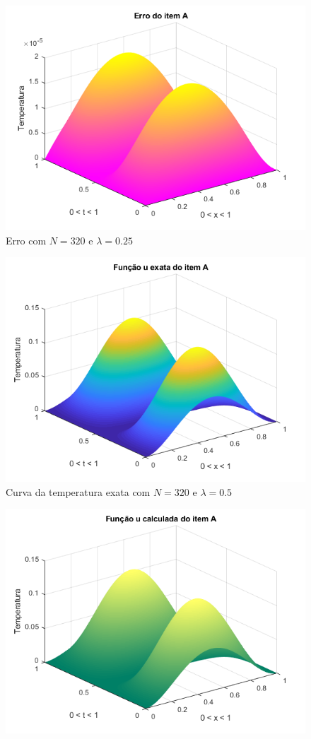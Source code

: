 \documentclass[12pt]{article}
\begin{document}
\begin{spacing}{1.5}
\begin{figure}
    \includegraphics[width=0.8\linewidth]{Primeira_Tarefa/ItemA/n320_lambda0-25_erro.png}
    \caption{Erro com $N=320$ e $\lambda=0.25$}
    \label{fig:A_n320lambda0-25_erro}
\end{figure}
\begin{figure}
    \centering
    \includegraphics[width=0.8\linewidth]{Primeira_Tarefa/ItemA/n320_lambda0-5_exata.png}
    \caption{Curva da temperatura exata com $N=320$ e $\lambda=0.5$}
    \label{fig:A_n320lambda0-5_exata}
\end{figure}
\begin{figure}
    \centering
    \includegraphics[width=0.8\linewidth]{Primeira_Tarefa/ItemA/n320_lambda0-5_calc.png}

\end{figure}
\end{spacing}
\end{document}
